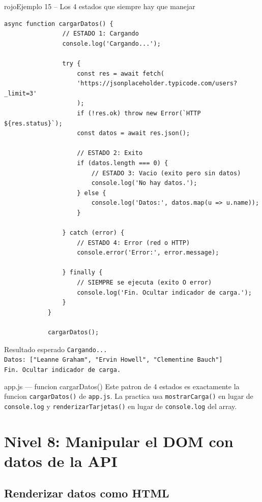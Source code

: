 \documentclass[11pt,a4paper]{article}
\newcounter{nej}\setcounter{nej}{0}
\begin{document}
	\begin{cajacodigo}{rojo}{Ejemplo 15 -- Los 4 estados que siempre hay que manejar}
		\begin{lstlisting}[style=codejs]
			async function cargarDatos() {
				// ESTADO 1: Cargando
				console.log('Cargando...');
				
				try {
					const res = await fetch(
					'https://jsonplaceholder.typicode.com/users?_limit=3'
					);
					if (!res.ok) throw new Error(`HTTP ${res.status}`);
					const datos = await res.json();
					
					// ESTADO 2: Exito
					if (datos.length === 0) {
						// ESTADO 3: Vacio (exito pero sin datos)
						console.log('No hay datos.');
					} else {
						console.log('Datos:', datos.map(u => u.name));
					}
					
				} catch (error) {
					// ESTADO 4: Error (red o HTTP)
					console.error('Error:', error.message);
					
				} finally {
					// SIEMPRE se ejecuta (exito O error)
					console.log('Fin. Ocultar indicador de carga.');
				}
			}
			
			cargarDatos();
		\end{lstlisting}
	\end{cajacodigo}
	
	\begin{cajaresultado}{Resultado esperado}
		\texttt{Cargando...}\\
		\texttt{Datos: ["Leanne Graham", "Ervin Howell", "Clementine Bauch"]}\\
		\texttt{Fin. Ocultar indicador de carga.}
	\end{cajaresultado}
	
	\begin{cajapractica}{app.js --- funcion cargarDatos()}
		Este patron de 4 estados es exactamente la funcion \texttt{cargarDatos()} de \texttt{app.js}. La practica usa \texttt{mostrarCarga()} en lugar de \texttt{console.log} y \texttt{renderizarTarjetas()} en lugar de \texttt{console.log} del array.
	\end{cajapractica}
	
	\section{Nivel 8: Manipular el DOM con datos de la API}
	
	\subsection{Renderizar datos como HTML}
	
\end{document}
